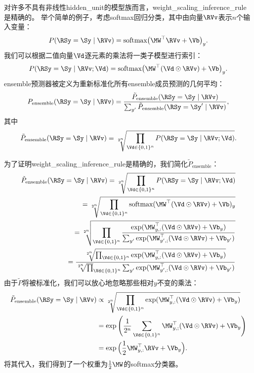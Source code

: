 对许多不具有非线性\gls{hidden_unit}的模型族而言，\gls{weight_scaling_inference_rule}是精确的。
举个简单的例子，考虑\gls{softmax}回归分类，其中由向量$\RVv$表示$n$个输入变量：
\begin{align}
 P(\RSy = \Sy \mid \RVv) = \text{softmax}\big(\MW^\top\RVv + \Vb\big)_y.
\end{align}
我们可以根据二值向量$\Vd$逐元素的乘法将一类子模型进行索引：
\begin{align}
P(\RSy = \Sy \mid \RVv; \Vd) = \text{softmax}\big(\MW^\top(\Vd \odot \RVv) + \Vb \big)_y.
\end{align}
\gls{ensemble}预测器被定义为重新标准化所有\gls{ensemble}成员预测的几何平均：
\begin{align} \label{eq:758pe}
P_{\text{ensemble}}(\RSy = \Sy \mid \RVv)  = \frac{\tilde{P}_{\text{ensemble}}(\RSy = \Sy \mid \RVv)}
 {\sum_{y'}\tilde{P}_{\text{ensemble}}(\RSy = \Sy' \mid \RVv) },
\end{align}
其中
\begin{align}
\tilde{P}_{\text{ensemble}}(\RSy=\Sy \mid \RVv) =
\sqrt[2^n]{\prod_{\Vd \in \{0,1\}^n} P(\RSy = \Sy \mid \RVv; \Vd)}.
\end{align}

为了证明\gls{weight_scaling_inference_rule}是精确的，我们简化$ \tilde{P}_{\text{ensemble}}$：
\begin{align}
\tilde{P}_{\text{ensemble}}(\RSy=\Sy \mid \RVv) =
\sqrt[2^n]{\prod_{\Vd \in \{0,1\}^n} P(\RSy = \Sy \mid \RVv; \Vd)} \\
= \sqrt[2^n]{\prod_{\Vd \in \{0,1\}^n} \text{softmax}(\MW^\top(\Vd \odot \RVv) + \Vb)_y} \\
= \sqrt[2^n]{\prod_{\Vd \in \{0,1\}^n} \frac{\exp (\MW_{y,:}^\top(\Vd \odot \RVv) + \Vb_y)}
{\sum_{y'}\exp (\MW_{y',;}^\top(\Vd \odot \RVv) + \Vb_{y'})}}\\
=  \frac{\sqrt[2^n]{\prod_{\Vd \in \{0,1\}^n}\exp (\MW_{y,:}^\top(\Vd \odot \RVv) + \Vb_y)}}
{ \sqrt[2^n] \prod_{\Vd \in \{0,1\}^n} \sum_{y'}\exp (\MW_{y',:}^\top(\Vd \odot \RVv) + \Vb_{y'})}
\end{align}
由于$\tilde P$将被标准化，我们可以放心地忽略那些相对$y$不变的乘法：
\begin{align}
\tilde{P}_{\text{ensemble}}(\RSy=\Sy \mid \RVv) &\propto 
\sqrt[2^n]{\prod_{\Vd \in \{0,1\}^n} \exp (\MW_{y,:}^\top(\Vd \odot \RVv) + \Vb_y)} \\
& = \exp \Bigg(\frac{1}{2^n} \sum_{\Vd \in \{0,1\}^n} \MW_{y,;}^\top(\Vd \odot \RVv) + \Vb_y \Bigg) \\
& = \exp \Big(\frac{1}{2}\MW_{y,:}^\top \RVv + \Vb_y \Big) .
\end{align}
将其代入，我们得到了一个权重为$\frac{1}{2}\MW$的\gls{softmax}分类器。

